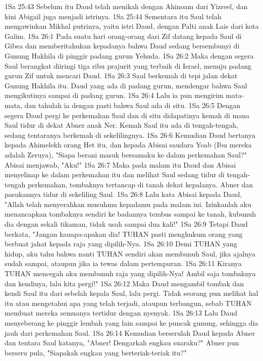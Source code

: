 1Sa 25:43  Sebelum itu Daud telah menikah dengan Ahinoam dari Yizreel, dan kini Abigail juga menjadi istrinya.
1Sa 25:44  Sementara itu Saul telah mengawinkan Mikhal putrinya, yaitu istri Daud, dengan Palti anak Lais dari kota Galim.
1Sa 26:1  Pada suatu hari orang-orang dari Zif datang kepada Saul di Gibea dan memberitahukan kepadanya bahwa Daud sedang bersembunyi di Gunung Hakhila di pinggir padang gurun Yehuda.
1Sa 26:2  Maka dengan segera Saul berangkat diiringi tiga ribu prajurit yang terbaik di Israel, menuju padang gurun Zif untuk mencari Daud.
1Sa 26:3  Saul berkemah di tepi jalan dekat Gunung Hakhila itu. Daud yang ada di padang gurun, mendengar bahwa Saul mengikutinya sampai di padang gurun.
1Sa 26:4  Lalu ia pun mengirim mata-mata, dan tahulah ia dengan pasti bahwa Saul ada di situ.
1Sa 26:5  Dengan segera Daud pergi ke perkemahan Saul dan di situ didapatinya kemah di mana Saul tidur di dekat Abner anak Ner. Kemah Saul itu ada di tengah-tengah, sedang tentaranya berkemah di sekelilingnya.
1Sa 26:6  Kemudian Daud bertanya kepada Ahimelekh orang Het itu, dan kepada Abisai saudara Yoab (Ibu mereka adalah Zeruya), "Siapa berani masuk bersamaku ke dalam perkemahan Saul?" Abisai menjawab, "Aku!"
1Sa 26:7  Maka pada malam itu Daud dan Abisai menyelinap ke dalam perkemahan itu dan melihat Saul sedang tidur di tengah-tengah perkemahan, tombaknya tertancap di tanah dekat kepalanya. Abner dan pasukannya tidur di sekeliling Saul.
1Sa 26:8  Lalu kata Abisai kepada Daud, "Allah telah menyerahkan musuhmu kepadamu pada malam ini. Izinkanlah aku menancapkan tombaknya sendiri ke badannya tembus sampai ke tanah, kubunuh dia dengan sekali tikaman, tidak usah sampai dua kali!"
1Sa 26:9  Tetapi Daud berkata, "Jangan kauapa-apakan dia! TUHAN pasti menghukum orang yang berbuat jahat kepada raja yang dipilih-Nya.
1Sa 26:10  Demi TUHAN yang hidup, aku tahu bahwa nanti TUHAN sendiri akan membunuh Saul, jika ajalnya sudah sampai, ataupun jika ia tewas dalam pertempuran.
1Sa 26:11  Kiranya TUHAN mencegah aku membunuh raja yang dipilih-Nya! Ambil saja tombaknya dan kendinya, lalu kita pergi!"
1Sa 26:12  Maka Daud mengambil tombak dan kendi Saul itu dari sebelah kepala Saul, lalu pergi. Tidak seorang pun melihat hal itu atau mengetahui apa yang telah terjadi, ataupun terbangun, sebab TUHAN membuat mereka semuanya tertidur dengan nyenyak.
1Sa 26:13  Lalu Daud menyeberang ke pinggir lembah yang lain sampai ke puncak gunung, sehingga dia jauh dari perkemahan Saul.
1Sa 26:14  Kemudian berserulah Daud kepada Abner dan tentara Saul katanya, "Abner! Dengarkah engkau suaraku?" Abner pun berseru pula, "Siapakah engkau yang berteriak-teriak itu?"
